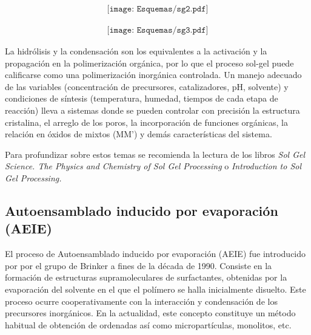 			\begin{equation}
		    	\begin{aligned}
 	 	 		\texttt{[image: Esquemas/sg2.pdf]}
 	 	 		\end{aligned}
 	 	 		\label{eq:oxosg2}
 	 	 		\end{equation}

			\begin{equation}
 	 	 		\begin{aligned}
 	 	 		\texttt{[image: Esquemas/sg3.pdf]}
 	 	 		\label{eq:olasg3}
 	 	 		\end{aligned}
 	 	 		\end{equation}

	 La hidrólisis y la condensación son los equivalentes a la activación y la propagación en la polimerización orgánica, por lo que el proceso sol-gel puede calificarse como una polimerización inorgánica controlada. Un manejo adecuado de las variables (concentración de precursores, catalizadores, pH, solvente) y condiciones de síntesis (temperatura, humedad, tiempos de cada etapa de reacción) lleva a sistemas donde se pueden controlar con precisión  la estructura cristalina, el arreglo de los poros, la incorporación de funciones orgánicas, la relación en óxidos de mixtos (MM') y demás características del sistema.

	 Para profundizar sobre estos temas se recomienda la lectura de los libros \textit{Sol Gel Science. The Physics and Chemistry of Sol Gel Processing}\cite{Wright2001} o \textit{Introduction to Sol Gel Processing.} \cite{Pierre1998} 
	
	\subsection{Autoensamblado inducido por evaporación (AEIE)}

	 El proceso de Autoensamblado inducido por evaporación (AEIE) fue introducido por por el grupo de Brinker a fines de la década de 1990.\cite{Lu1997,Brinker1999} Consiste en la formación de estructuras supramoleculares de surfactantes, obtenidas por la evaporación del solvente en el que el polímero se halla inicialmente disuelto. Este proceso ocurre cooperativamente con la interacción y condensación de los precursores inorgánicos. En la actualidad, este concepto constituye un método habitual de obtención de \pdm\space ordenadas\cite{Grosso2004} así como micropartículas, monolitos, etc.\cite{Yang1998a}

